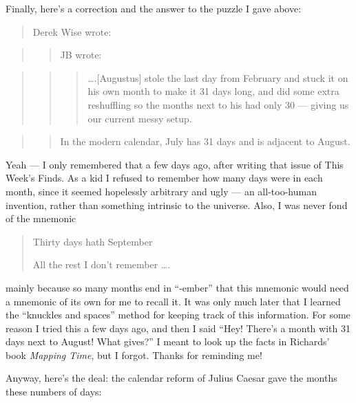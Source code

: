 \documentclass{article}
\begin{document}
Finally, here's a correction and the answer to the puzzle I gave above:

\begin{quote}
Derek Wise wrote:
\end{quote}

\begin{quote}
\begin{quote}
JB wrote:
\end{quote}
\end{quote}

\begin{quote}
\begin{quote}
\begin{quote}
\ldots.{[}Augustus{]} stole the last day from February and stuck it on
his own month to make it 31 days long, and did some extra reshuffling so
the months next to his had only 30 --- giving us our current messy
setup.
\end{quote}
\end{quote}
\end{quote}

\begin{quote}
\begin{quote}
In the modern calendar, July has 31 days and is adjacent to August.
\end{quote}
\end{quote}

Yeah --- I only remembered that a few days ago, after writing that issue
of This Week's Finds. As a kid I refused to remember how many days were
in each month, since it seemed hopelessly arbitrary and ugly --- an
all-too-human invention, rather than something intrinsic to the
universe. Also, I was never fond of the mnemonic

\begin{quote}
Thirty days hath September

All the rest I don't remember \ldots.
\end{quote}

mainly because so many months end in ``-ember'' that this mnemonic would
need a mnemonic of its own for me to recall it. It was only much later
that I learned the ``knuckles and spaces'' method for keeping track of
this information. For some reason I tried this a few days ago, and then
I said ``Hey! There's a month with 31 days next to August! What gives?''
I meant to look up the facts in Richards' book \emph{Mapping Time}, but
I forgot. Thanks for reminding me!

Anyway, here's the deal: the calendar reform of Julius Caesar gave the
months these numbers of days:
\end{document}
